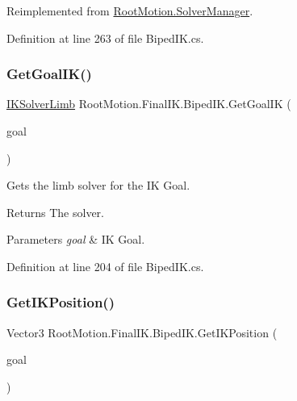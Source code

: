 Reimplemented from \mbox{\hyperlink{class_root_motion_1_1_solver_manager_addb54e92acd91364a9205c5807a42776}{Root\+Motion.\+Solver\+Manager}}.



Definition at line 263 of file Biped\+I\+K.\+cs.

\mbox{\label{class_root_motion_1_1_final_i_k_1_1_biped_i_k_a9dc41de7fb0b0d22edf7b5cb6a4b0b4b}} 
\subsubsection{\texorpdfstring{Get\+Goal\+I\+K()}{GetGoalIK()}}
{\footnotesize\ttfamily \mbox{\hyperlink{class_root_motion_1_1_final_i_k_1_1_i_k_solver_limb}{I\+K\+Solver\+Limb}} Root\+Motion.\+Final\+I\+K.\+Biped\+I\+K.\+Get\+Goal\+IK (\begin{DoxyParamCaption}\item[{Avatar\+I\+K\+Goal}]{goal }\end{DoxyParamCaption})}



Gets the limb solver for the IK Goal. 

\begin{DoxyReturn}{Returns}
The solver. 
\end{DoxyReturn}

\begin{DoxyParams}{Parameters}
{\em goal} & IK Goal. \\
\hline
\end{DoxyParams}


Definition at line 204 of file Biped\+I\+K.\+cs.

\mbox{\label{class_root_motion_1_1_final_i_k_1_1_biped_i_k_a1e446da70b9d2de7dce7d9587844bbd5}} 
\subsubsection{\texorpdfstring{Get\+I\+K\+Position()}{GetIKPosition()}}
{\footnotesize\ttfamily Vector3 Root\+Motion.\+Final\+I\+K.\+Biped\+I\+K.\+Get\+I\+K\+Position (\begin{DoxyParamCaption}\item[{Avatar\+I\+K\+Goal}]{goal }\end{DoxyParamCaption})}



